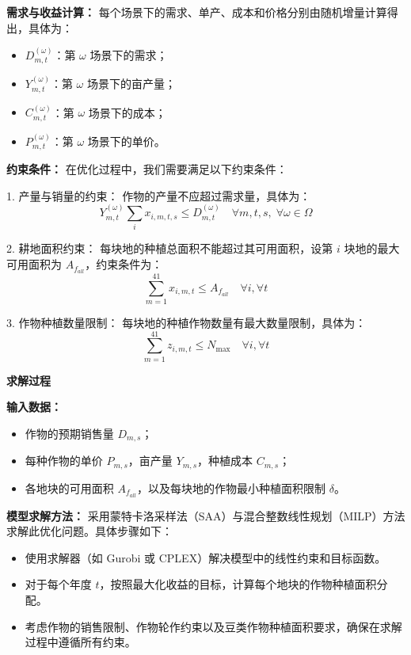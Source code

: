 \textbf{需求与收益计算：}  
每个场景下的需求、单产、成本和价格分别由随机增量计算得出，具体为：

\begin{itemize}
    \item $D_{m,t}^{(\omega)}$：第 $\omega$ 场景下的需求；
    \item $Y_{m,t}^{(\omega)}$：第 $\omega$ 场景下的亩产量；
    \item $C_{m,t}^{(\omega)}$：第 $\omega$ 场景下的成本；
    \item $P_{m,t}^{(\omega)}$：第 $\omega$ 场景下的单价。
\end{itemize}

\textbf{约束条件：}  
在优化过程中，我们需要满足以下约束条件：

1. 产量与销量的约束：
作物的产量不应超过需求量，具体为：
\begin{equation}
Y_{m,t}^{(\omega)}\sum_{i}x_{i,m,t,s} \leq D_{m,t}^{(\omega)} \quad \forall m,t,s,\;\forall \omega \in \Omega
\end{equation}

2. 耕地面积约束：
每块地的种植总面积不能超过其可用面积，设第 $i$ 块地的最大可用面积为 $A_{f_{all}}$，约束条件为：
\begin{equation}
\sum_{m=1}^{41} x_{i,m,t} \leq A_{f_{all}} \quad \forall i, \forall t
\end{equation}

3. 作物种植数量限制： 
每块地的种植作物数量有最大数量限制，具体为：
\begin{equation}
\sum_{m=1}^{41} z_{i,m,t} \leq N_{\text{max}} \quad \forall i, \forall t
\end{equation}

\textbf{求解过程}

\textbf{输入数据：}  
\begin{itemize}
    \item 作物的预期销售量 $D_{m,s}$；
    \item 每种作物的单价 $P_{m,s}$，亩产量 $Y_{m,s}$，种植成本 $C_{m,s}$；
    \item 各地块的可用面积 $A_{f_{all}}$，以及每块地的作物最小种植面积限制 $\delta$。
\end{itemize}

\textbf{模型求解方法：}  
采用蒙特卡洛采样法（SAA）与混合整数线性规划（MILP）方法求解此优化问题。具体步骤如下：

\begin{itemize}
    \item 使用求解器（如 Gurobi 或 CPLEX）解决模型中的线性约束和目标函数。
    \item 对于每个年度 $t$，按照最大化收益的目标，计算每个地块的作物种植面积分配。
    \item 考虑作物的销售限制、作物轮作约束以及豆类作物种植面积要求，确保在求解过程中遵循所有约束。
\end{itemize}

